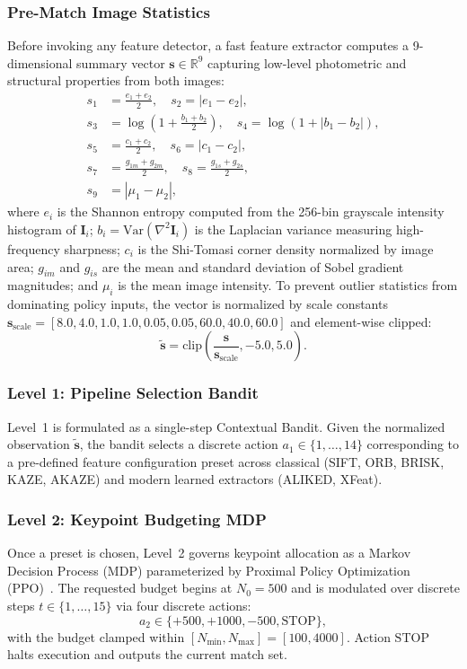 \documentclass[conference]{IEEEtran}
\begin{document}
\subsubsection{Pre-Match Image Statistics}
Before invoking any feature detector, a fast feature extractor computes a 9-dimensional summary vector $\mathbf{s} \in \mathbb{R}^9$ capturing low-level photometric and structural properties from both images:
\begin{align}
s_1 &= \frac{e_1 + e_2}{2}, \quad s_2 = |e_1 - e_2|, \\
s_3 &= \log\left(1 + \frac{b_1 + b_2}{2}\right), \quad s_4 = \log(1 + |b_1 - b_2|), \\
s_5 &= \frac{c_1 + c_2}{2}, \quad s_6 = |c_1 - c_2|, \\
s_7 &= \frac{g_{1m} + g_{2m}}{2}, \quad s_8 = \frac{g_{1s} + g_{2s}}{2}, \\
s_9 &= |\mu_1 - \mu_2|,
\end{align}
where $e_i$ is the Shannon entropy computed from the 256-bin grayscale intensity histogram of $\mathbf{I}_i$; $b_i = \mathrm{Var}(\nabla^2 \mathbf{I}_i)$ is the Laplacian variance measuring high-frequency sharpness; $c_i$ is the Shi-Tomasi corner density normalized by image area; $g_{im}$ and $g_{is}$ are the mean and standard deviation of Sobel gradient magnitudes; and $\mu_i$ is the mean image intensity. To prevent outlier statistics from dominating policy inputs, the vector is normalized by scale constants $\mathbf{s}_{\text{scale}} = [8.0, 4.0, 1.0, 1.0, 0.05, 0.05, 60.0, 40.0, 60.0]$ and element-wise clipped:
\begin{equation}
\mathbf{\tilde{s}} = \mathrm{clip}\left(\frac{\mathbf{s}}{\mathbf{s}_{\text{scale}}}, -5.0, 5.0\right).
\end{equation}

\subsubsection{Level 1: Pipeline Selection Bandit}
Level~1 is formulated as a single-step Contextual Bandit. Given the normalized observation $\mathbf{\tilde{s}}$, the bandit selects a discrete action $a_1 \in \{1, \dots, 14\}$ corresponding to a pre-defined feature configuration preset across classical (SIFT, ORB, BRISK, KAZE, AKAZE) and modern learned extractors (ALIKED, XFeat).

\subsubsection{Level 2: Keypoint Budgeting MDP}
Once a preset is chosen, Level~2 governs keypoint allocation as a Markov Decision Process (MDP) parameterized by Proximal Policy Optimization (PPO)~\cite{schulman2017ppo}. The requested budget begins at $N_0 = 500$ and is modulated over discrete steps $t \in \{1, \dots, 15\}$ via four discrete actions:
\begin{equation}
a_2 \in \{+500, +1000, -500, \mathrm{STOP}\},
\end{equation}
with the budget clamped within $[N_{\min}, N_{\max}] = [100, 4000]$. Action $\mathrm{STOP}$ halts execution and outputs the current match set.
\end{document}
